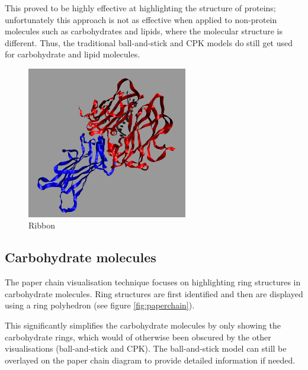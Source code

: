 This proved to be highly effective at highlighting the structure of proteins;
unfortunately this approach is not as effective when applied to non-protein
molecules such as carbohydrates and lipids, where the molecular structure is
different. Thus, the traditional ball-and-stick and CPK models do still get
used for carbohydrate and lipid molecules.

\begin{figure}[h!]
  \begin{center}
    \includegraphics[width=70mm]{ribbon}
  \end{center}
  \caption{Ribbon}
  \label{fig:ribbon}
\end{figure}


\subsection{Carbohydrate molecules}
\label{sub:carbohydrate}

The paper chain visualisation technique \citep{kuttel06} focuses on highlighting
ring structures in carbohydrate molecules. Ring structures are first identified
and then are displayed using a ring polyhedron (see figure \ref{fig:paperchain}).

This significantly simplifies the carbohydrate molecules by only showing the
carbohydrate rings, which would of otherwise been obscured by the other
visualisations (ball-and-stick and CPK). The ball-and-stick model can still be
overlayed on the paper chain diagram to provide detailed information if needed.

